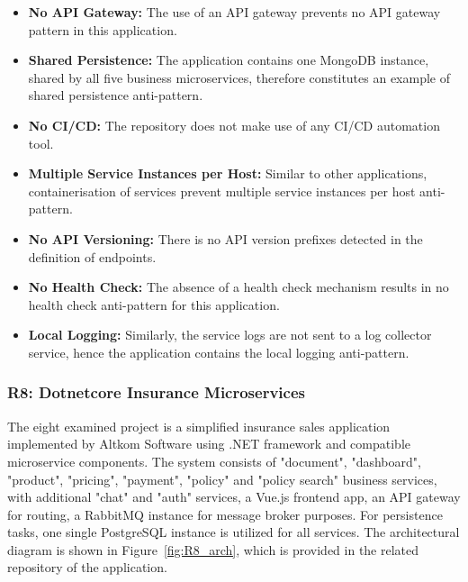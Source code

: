 \documentclass{Configuration_Files/PoliMi3i_thesis}
\begin{document}
\begin{itemize}
    \item \textbf{No API Gateway:} The use of an API gateway prevents no API gateway pattern in this application.
    
    \item \textbf{Shared Persistence:} The application contains one MongoDB instance, shared by all five business microservices, therefore constitutes an example of shared persistence anti-pattern.
    
    \item \textbf{No CI/CD:} The repository does not make use of any CI/CD automation tool.
    
    \item \textbf{Multiple Service Instances per Host:} Similar to other applications, containerisation of services prevent multiple service instances per host anti-pattern.
    
    \item \textbf{No API Versioning:} There is no API version prefixes detected in the definition of endpoints.
    
    \item \textbf{No Health Check:} The absence of a health check mechanism results in no health check anti-pattern for this application.
    
    \item \textbf{Local Logging:} Similarly, the service logs are not sent to a log collector service, hence the application contains the local logging anti-pattern.
\end{itemize}

\subsubsection{R8: Dotnetcore Insurance Microservices}
\label{subsubsec:R8}

The eight examined project is a simplified insurance sales application implemented by Altkom Software\footnotemark[102] using .NET framework and compatible microservice components.
The system consists of "document", "dashboard", "product", "pricing", "payment", "policy" and "policy search" business services, with additional "chat" and "auth" services, a Vue.js frontend app, an API gateway for routing, a RabbitMQ instance for message broker purposes.
For persistence tasks, one single PostgreSQL instance is utilized for all services.
The architectural diagram is shown in Figure~\ref{fig:R8_arch}, which is provided in the related repository of the application.
\end{document}
